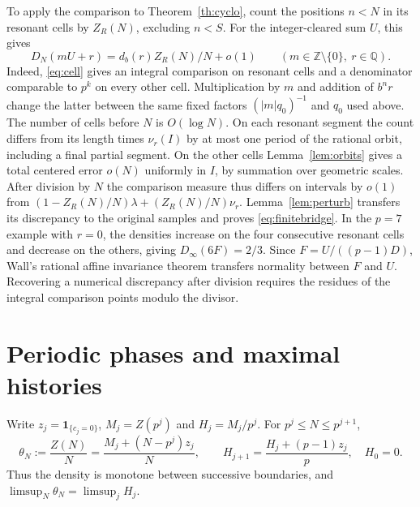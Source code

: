\documentclass[11pt]{article}
\newcommand{\Z}{\mathbb Z}
\newcommand{\Q}{\mathbb Q}
\begin{document}
To apply the comparison to Theorem~\ref{th:cyclo}, count the positions \(n<N\) in its resonant cells by \(Z_R(N)\), excluding \(n<S\). For the integer-cleared sum \(U\), this gives
\begin{equation}\label{eq:finitebridge}
 D_N(mU+r)=d_b(r)Z_R(N)/N+o(1)\qquad (m\in\Z\setminus\{0\},\ r\in\Q).
\end{equation}
Indeed, \eqref{eq:cell} gives an integral comparison on resonant cells and a denominator comparable to \(p^k\) on every other cell. Multiplication by \(m\) and addition of \(b^nr\) change the latter between the same fixed factors \((|m|q_0)^{-1}\) and \(q_0\) used above. The number of cells before \(N\) is \(O(\log N)\).
On each resonant segment the count differs from its length times \(\nu_r(I)\)
by at most one period of the rational orbit, including a final partial segment.
On the other cells Lemma~\ref{lem:orbits} gives a total centered error \(o(N)\)
uniformly in \(I\), by summation over geometric scales. After division by \(N\)
the comparison measure thus differs on intervals by \(o(1)\) from
\((1-Z_R(N)/N)\lambda+(Z_R(N)/N)\nu_r\). Lemma~\ref{lem:perturb} transfers its
discrepancy to the original samples and proves \eqref{eq:finitebridge}. In the \(p=7\) example with \(r=0\), the densities increase on the four consecutive resonant cells and decrease on the others, giving \(D_\infty(6F)=2/3\). Since \(F=U/((p-1)D)\), Wall's rational affine invariance theorem \cite{wall} transfers normality between \(F\) and \(U\). Recovering a numerical discrepancy after division requires the residues of the integral comparison points modulo the divisor.


\section{Periodic phases and maximal histories}\label{sec:hist}
Write \(z_j=\mathbf1_{\{c_j=0\}}\), \(M_j=Z(p^j)\) and \(H_j=M_j/p^j\). For \(p^j\le N\le p^{j+1}\),
\begin{equation}\label{eq:cycle}
 \theta_N:=\frac{Z(N)}{N}=\frac{M_j+(N-p^j)z_j}{N},\qquad
 H_{j+1}=\frac{H_j+(p-1)z_j}{p},\quad H_0=0.
\end{equation}
Thus the density is monotone between successive boundaries, and \(\limsup_N \theta_N=\limsup_j H_j\).
\end{document}
